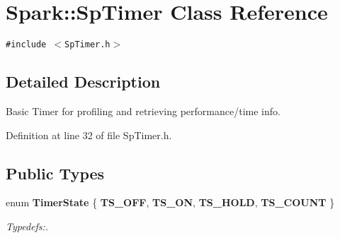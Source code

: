 \section{Spark::Sp\-Timer Class Reference}
\label{classSpark_1_1SpTimer}
{\tt \#include $<$Sp\-Timer.h$>$}



\subsection{Detailed Description}
Basic Timer for profiling and retrieving performance/time info. 

Definition at line 32 of file Sp\-Timer.h.\subsection*{Public Types}
\begin{CompactItemize}
\item 
enum {\bf Timer\-State} \{ {\bf TS\_\-OFF}, 
{\bf TS\_\-ON}, 
{\bf TS\_\-HOLD}, 
{\bf TS\_\-COUNT}
 \}
\begin{CompactList}\small\item\em Typedefs:. \item\end{CompactList}\end{CompactItemize}
